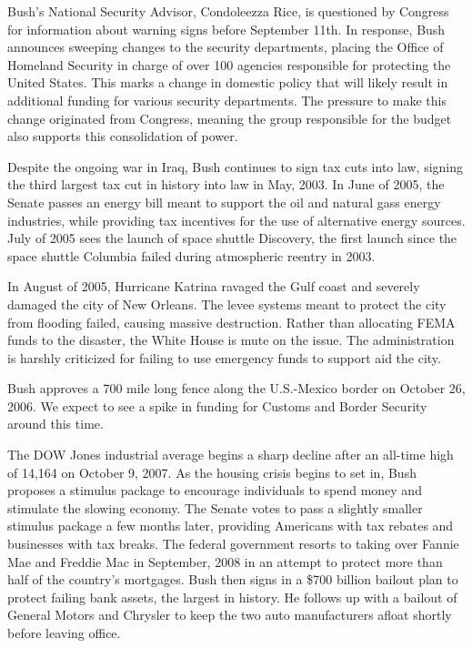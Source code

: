 \documentclass{article}
\begin{document}
        \par
        Bush's National Security Advisor, Condoleezza Rice, is questioned by Congress for information about warning signs before September 11th. In response, Bush announces sweeping changes to the security departments, placing the Office of Homeland Security in charge of over 100 agencies responsible for protecting the United States.\cite{bushevents} This marks a change in domestic policy that will likely result in additional funding for various security departments. The pressure to make this change originated from Congress, meaning the group responsible for the budget also supports this consolidation of power.
        \par
        Despite the ongoing war in Iraq, Bush continues to sign tax cuts into law, signing the third largest tax cut in history into law in May, 2003. In June of 2005, the Senate passes an energy bill meant to support the oil and natural gass energy industries, while providing tax incentives for the use of alternative energy sources. July of 2005 sees the launch of space shuttle Discovery, the first launch since the space shuttle Columbia failed during atmospheric reentry in 2003.\cite{bushevents}
        \par
        In August of 2005, Hurricane Katrina ravaged the Gulf coast and severely damaged the city of New Orleans. The levee systems meant to protect the city from flooding failed, causing massive destruction. Rather than allocating FEMA funds to the disaster, the White House is mute on the issue. The administration is harshly criticized for failing to use emergency funds to support aid the city.
        \par
        Bush approves a 700 mile long fence along the U.S.-Mexico border on October 26, 2006. We expect to see a spike in funding for Customs and Border Security around this time.
        \par
        The DOW Jones industrial average begins a sharp decline after an all-time high of 14,164 on October 9, 2007. As the housing crisis begins to set in, Bush proposes a stimulus package to encourage individuals to spend money and stimulate the slowing economy. The Senate votes to pass a slightly smaller stimulus package a few months later, providing Americans with tax rebates and businesses with tax breaks. The federal government resorts to taking over Fannie Mae and Freddie Mac in September, 2008 in an attempt to protect more than half of the country's mortgages. Bush then signs in a \$700 billion bailout plan to protect failing bank assets, the largest in history. He follows up with a bailout of General Motors and Chrysler to keep the two auto manufacturers afloat shortly before leaving office. \cite{bushevents}
\end{document}
